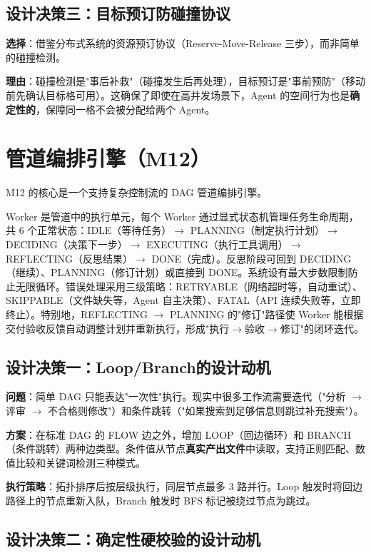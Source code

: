 \documentclass[12pt,a4paper]{article}%
\begin{document}
\subsection{设计决策三：目标预订防碰撞协议}

\textbf{选择}：借鉴分布式系统的资源预订协议（Reserve-Move-Release 三步），而非简单的碰撞检测。

\textbf{理由}：碰撞检测是"事后补救"（碰撞发生后再处理），目标预订是"事前预防"（移动前先确认目标格可用）。这确保了即使在高并发场景下，Agent 的空间行为也是\textbf{确定性的}，保障同一格不会被分配给两个 Agent。

\section{管道编排引擎（M12）}

M12 的核心是一个支持复杂控制流的 DAG 管道编排引擎。

Worker 是管道中的执行单元，每个 Worker 通过显式状态机管理任务生命周期，共 6 个正常状态：IDLE（等待任务）$\to$ PLANNING（制定执行计划）$\to$ DECIDING（决策下一步）$\to$ EXECUTING（执行工具调用）$\to$ REFLECTING（反思结果）$\to$ DONE（完成）。反思阶段可回到 DECIDING（继续）、PLANNING（修订计划）或直接到 DONE。系统设有最大步数限制防止无限循环。错误处理采用三级策略：RETRYABLE（网络超时等，自动重试）、SKIPPABLE（文件缺失等，Agent 自主决策）、FATAL（API 连续失败等，立即终止）。特别地，REFLECTING $\to$ PLANNING 的"修订"路径使 Worker 能根据交付验收反馈自动调整计划并重新执行，形成"执行$\to$验收$\to$修订"的闭环迭代。

\subsection{设计决策一：Loop/Branch的设计动机}

\textbf{问题}：简单 DAG 只能表达"一次性"执行。现实中很多工作流需要迭代（"分析 $\to$ 评审 $\to$ 不合格则修改"）和条件跳转（"如果搜索到足够信息则跳过补充搜索"）。

\textbf{方案}：在标准 DAG 的 FLOW 边之外，增加 LOOP（回边循环）和 BRANCH（条件跳转）两种边类型。条件值从节点\textbf{真实产出文件}中读取，支持正则匹配、数值比较和关键词检测三种模式。

\textbf{执行策略}：拓扑排序后按层级执行，同层节点最多 3 路并行。Loop 触发时将回边路径上的节点重新入队，Branch 触发时 BFS 标记被绕过节点为跳过。

\subsection{设计决策二：确定性硬校验的设计动机}
\end{document}
